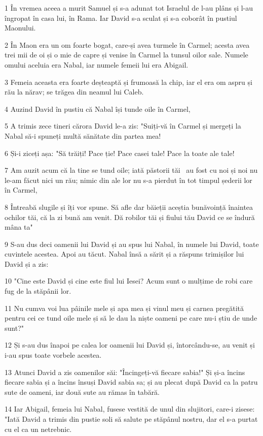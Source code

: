 \par 1 În vremea aceea a murit Samuel și s-a adunat tot Israelul de l-au plâns și l-au îngropat în casa lui, în Rama. Iar David s-a sculat și s-a coborât în pustiul Maonului.
\par 2 În Maon era un om foarte bogat, care-și avea turmele în Carmel; acesta avea trei mii de oi și o mie de capre și venise în Carmel la tunsul oilor sale. Numele omului aceluia era Nabal, iar numele femeii lui era Abigail.
\par 3 Femeia aceasta era foarte deșteaptă și frumoasă la chip, iar el era om aspru și rău la nărav; se trăgea din neamul lui Caleb.
\par 4 Auzind David în pustiu că Nabal își tunde oile în Carmel,
\par 5 A trimis zece tineri cărora David le-a zis: "Suiți-vă în Carmel și mergeți la Nabal să-i spuneți multă sănătate din partea mea!
\par 6 Și-i ziceți așa: "Să trăiți! Pace ție! Pace casei tale! Pace la toate ale tale!
\par 7 Am auzit acum că la tine se tund oile; iată păstorii tăi  au fost cu noi și noi nu le-am făcut nici un rău; nimic din ale lor nu s-a pierdut în tot timpul șederii lor în Carmel,
\par 8 Întreabă slugile și îți vor spune. Să afle dar băieții aceștia bunăvoință înaintea ochilor tăi, că la zi bună am venit. Dă robilor tăi și fiului tău David ce se îndură mâna ta"
\par 9 S-au dus deci oamenii lui David și au spus lui Nabal, în numele lui David, toate cuvintele acestea. Apoi au tăcut. Nabal însă a sărit și a răspuns trimișilor lui David și a zis:
\par 10 "Cine este David și cine este fiul lui Iesei? Acum sunt o mulțime de robi care fug de la stăpânii lor.
\par 11 Nu cumva voi lua pâinile mele și apa mea și vinul meu și carnea pregătită pentru cei ce tund oile mele și să le dau la niște oameni pe care nu-i știu de unde sunt?"
\par 12 Și s-au dus înapoi pe calea lor oamenii lui David și, întorcându-se, au venit și i-au spus toate vorbele acestea.
\par 13 Atunci David a zis oamenilor săi: "Încingeți-vă fiecare sabia!" Și și-a încins fiecare sabia și a încins însuși David sabia sa; și au plecat după David ca la patru sute de oameni, iar două sute au rămas în tabără.
\par 14 Iar Abigail, femeia lui Nabal, fusese vestită de unul din slujitori, care-i zisese: "Iată David a trimis din pustie soli să salute pe stăpânul nostru, dar el s-a purtat cu el ca un netrebnic.
